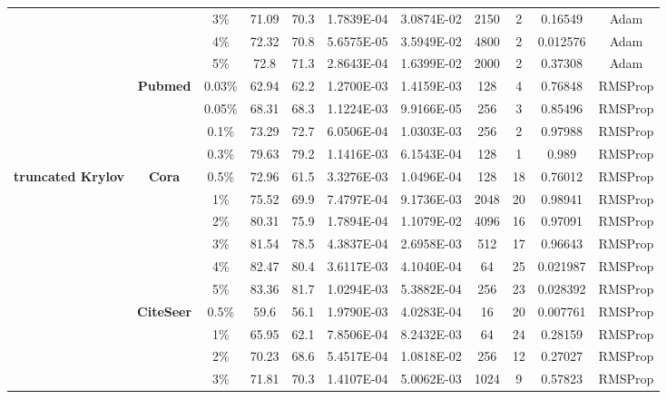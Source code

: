 \documentclass{article}
\begin{document}
\begin{table}[htbp]
\begin{tabular}{ccccc|cccccc}
          &       & 3\%   & 71.09 & 70.3  & 1.7839E-04 & 3.0874E-02 & 2150  & 2     & 0.16549 & Adam \\
          &       & 4\%   & 72.32 & 70.8  & 5.6575E-05 & 3.5949E-02 & 4800  & 2     & 0.012576 & Adam \\
          &       & 5\%   & 72.8  & 71.3  & 2.8643E-04 & 1.6399E-02 & 2000  & 2     & 0.37308 & Adam \\
          & \multirow{4}[1]{*}{\textbf{Pubmed}} & 0.03\% & 62.94 & 62.2  & 1.2700E-03 & 1.4159E-03 & 128   & 4     & 0.76848 & RMSProp \\
          &       & 0.05\% & 68.31 & 68.3  & 1.1224E-03 & 9.9166E-05 & 256   & 3     & 0.85496 & RMSProp \\
          &       & 0.1\% & 73.29 & 72.7  & 6.0506E-04 & 1.0303E-03 & 256   & 2     & 0.97988 & RMSProp \\
          &       & 0.3\% & 79.63 & 79.2  & 1.1416E-03 & 6.1543E-04 & 128   & 1     & 0.989 & RMSProp \\
    \midrule
    \multirow{16}[2]{*}{\textbf{truncated Krylov}} & \multirow{6}[1]{*}{\textbf{Cora}} & 0.5\% & 72.96 & 61.5  & 3.3276E-03 & 1.0496E-04 & 128   & 18    & 0.76012 & RMSProp \\
          &       & 1\%   & 75.52 & 69.9  & 7.4797E-04 & 9.1736E-03 & 2048  & 20    & 0.98941 & RMSProp \\
          &       & 2\%   & 80.31 & 75.9  & 1.7894E-04 & 1.1079E-02 & 4096  & 16    & 0.97091 & RMSProp \\
          &       & 3\%   & 81.54 & 78.5  & 4.3837E-04 & 2.6958E-03 & 512   & 17    & 0.96643 & RMSProp \\
          &       & 4\%   & 82.47 & 80.4  & 3.6117E-03 & 4.1040E-04 & 64    & 25    & 0.021987 & RMSProp \\
          &       & 5\%   & 83.36 & 81.7  & 1.0294E-03 & 5.3882E-04 & 256   & 23    & 0.028392 & RMSProp \\
          & \multirow{6}[0]{*}{\textbf{CiteSeer}} & 0.5\% & 59.6  & 56.1  & 1.9790E-03 & 4.0283E-04 & 16    & 20    & 0.007761 & RMSProp \\
          &       & 1\%   & 65.95 & 62.1  & 7.8506E-04 & 8.2432E-03 & 64    & 24    & 0.28159 & RMSProp \\
          &       & 2\%   & 70.23 & 68.6  & 5.4517E-04 & 1.0818E-02 & 256   & 12    & 0.27027 & RMSProp \\
          &       & 3\%   & 71.81 & 70.3  & 1.4107E-04 & 5.0062E-03 & 1024  & 9     & 0.57823 & RMSProp \\

\end{tabular}
\end{table}
\end{document}

